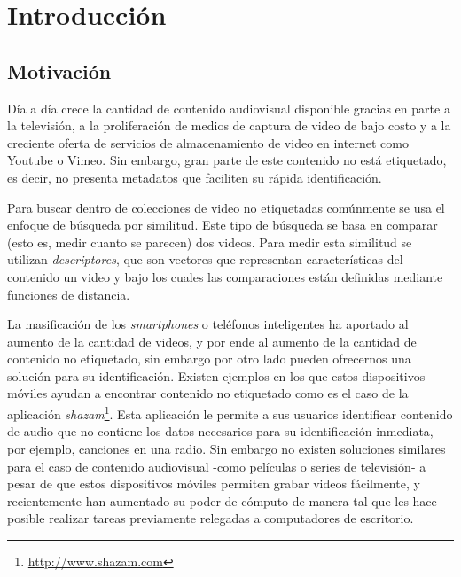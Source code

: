 \chapter{Introducción} \label{intro}

\section{Motivación} \label{motivacion}


Día a día crece la cantidad de contenido audiovisual disponible gracias en parte a la televisión, a la proliferación de medios de captura de video de bajo costo y a la creciente oferta de servicios de almacenamiento de video en internet como Youtube o Vimeo.
Sin embargo, gran parte de este contenido no está etiquetado, es decir, no presenta metadatos que faciliten su rápida identificación. 

Para buscar dentro de colecciones de video no etiquetadas comúnmente se usa el enfoque de búsqueda por similitud. Este tipo de búsqueda se basa en comparar (esto es, medir cuanto se parecen) dos videos. Para medir esta similitud se utilizan \emph{descriptores}, que son vectores que representan características del contenido un video y bajo los cuales las comparaciones están definidas mediante funciones de distancia.

La masificación de los \emph{smartphones} o teléfonos inteligentes ha aportado al aumento de la cantidad de videos, y por ende al aumento de la cantidad de contenido no etiquetado, sin embargo por otro lado pueden ofrecernos una solución para su identificación. Existen ejemplos en los que estos dispositivos móviles ayudan a encontrar contenido no etiquetado como es el caso de la aplicación \emph{shazam}\footnote{\url{http://www.shazam.com}}. Esta aplicación le permite a sus usuarios identificar contenido de audio que no contiene los datos necesarios para su identificación inmediata, por ejemplo, canciones en una radio. Sin embargo no existen soluciones similares para el caso de contenido audiovisual -como películas o series de televisión- a pesar de que estos dispositivos móviles permiten grabar videos fácilmente, y recientemente han aumentado su poder de cómputo de manera tal que les hace posible realizar tareas previamente relegadas a computadores de escritorio. 

